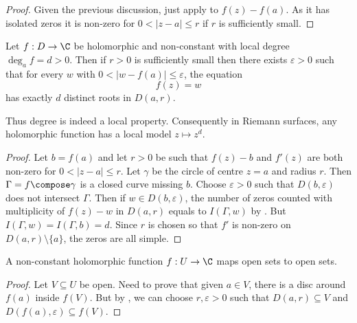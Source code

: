 \documentclass[a4paper]{article}
\begin{document}
\begin{proof}
  Given the previous discussion, just apply  to \(f(z) - f(a)\). As it has isolated zeros it is non-zero for \(0 < |z - a| \leq r\) if \(r\) is sufficiently small.
\end{proof}

\begin{theorem}
  \label{thm:local mapping degree}
  Let \(f: D \to \C\) be holomorphic and non-constant with local degree \(\deg_a f = d > 0\). Then if \(r > 0\) is sufficiently small then there exists \(\varepsilon > 0\) such that for every \(w\) with \(0 < |w - f(a)| \leq \varepsilon\), the equation
  \[
    f(z) = w
  \]
  has exactly \(d\) distinct roots in \(D(a, r)\).
\end{theorem}

Thus degree is indeed a local property. Consequently in Riemann surfaces, any holomorphic function has a local model \(z \mapsto z^d\).

\begin{proof}
  Let \(b = f(a)\) and let \(r > 0\) be such that \(f(z) - b\) and \(f'(z)\) are both non-zero for \(0 < |z - a| \leq r\). Let \(\gamma\) be the circle of centre \(z = a\) and radius \(r\). Then \(\Gamma = f \compose \gamma\) is a closed curve missing \(b\). Choose \(\varepsilon > 0\) such that \(D(b, \varepsilon)\) does not intersect \(\Gamma\). Then if \(w \in D(b, \varepsilon)\), the number of zeros counted with multiplicity of \(f(z) - w\) in \(D(a, r)\) equals to \(I(\Gamma, w)\) by . But \(I(\Gamma, w) = I(\Gamma, b) = d\). Since \(r\) is chosen so that \(f'\) is non-zero on \(D(a, r) \setminus \{a\}\), the zeros are all simple.
\end{proof}

\begin{corollary}
  \label{cor:open mapping theorem}
  A non-constant holomorphic function \(f: U \to \C\) maps open sets to open sets.
\end{corollary}

\begin{proof}
  Let \(V \subseteq U\) be open. Need to prove that given \(a \in V\), there is a disc around \(f(a)\) inside \(f(V)\). But by , we can choose \(r, \varepsilon > 0\) such that \(D(a, r) \subseteq V\) and \(D(f(a), \varepsilon) \subseteq f(V)\).
\end{proof}
\end{document}
